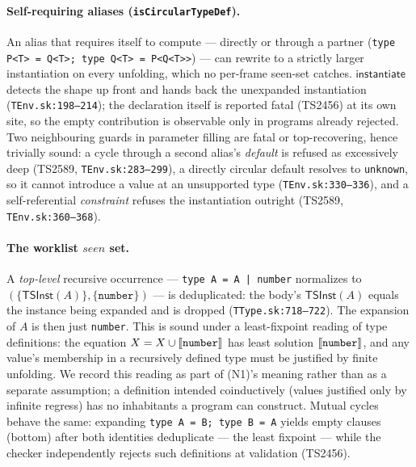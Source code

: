 \documentclass[11pt]{article}
\newcommand{\instop}{\mathsf{instantiate}}
\begin{document}
\paragraph{Self-requiring aliases (\texttt{isCircularTypeDef}).}
An alias that requires itself to compute — directly or through a
partner (\texttt{type P<T> = Q<T>; type Q<T> = P<Q<T>>}) — can rewrite
to a strictly larger instantiation on every unfolding, which no
per-frame seen-set catches. $\instop$ detects the shape up front and
hands back the unexpanded instantiation
(\texttt{TEnv.sk:198--214}); the declaration itself is reported fatal
(TS2456) at its own site, so the empty contribution is observable only
in programs already rejected. Two neighbouring guards in parameter
filling are fatal or top-recovering, hence trivially sound: a cycle
through a second alias's \emph{default} is refused as excessively deep
(TS2589, \texttt{TEnv.sk:283--299}), a directly circular default
resolves to \texttt{unknown}, so it cannot introduce a value at an unsupported type
(\texttt{TEnv.sk:330--336}), and a self-referential \emph{constraint}
refuses the instantiation outright (TS2589,
\texttt{TEnv.sk:360--368}).

\paragraph{The worklist $\mathit{seen}$ set.}
A \emph{top-level} recursive occurrence — \texttt{type A = A | number}
normalizes to $(\{\mathsf{TSInst}(A)\}, \{\texttt{number}\})$ — is
deduplicated: the body's $\mathsf{TSInst}(A)$ equals the instance being
expanded and is dropped (\texttt{TType.sk:718--722}). The expansion of
$A$ is then just \texttt{number}. This is sound under a least-fixpoint
reading of type definitions: the equation
$X = X \cup \llbracket \texttt{number} \rrbracket$ has least solution
$\llbracket \texttt{number} \rrbracket$, and any value's membership in a recursively
defined type must be justified by finite unfolding. We record this
reading as part of (N1)'s meaning rather than as a separate assumption;
a definition intended coinductively (values justified only by infinite
regress) has no inhabitants a program can construct.
Mutual cycles behave the same: expanding \texttt{type A = B; type B = A}
yields empty clauses (bottom) after both identities deduplicate — the
least fixpoint — while the checker independently rejects such
definitions at validation (TS2456).
\end{document}
